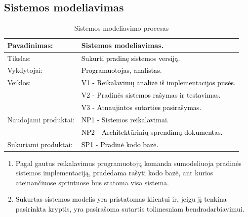 \documentclass{VUMIFPSkursinis}
\begin{document}
	\newpage

	\subsection{Sistemos modeliavimas}
	\begin{center}
		\begin{table}[ht]
			\caption{Sistemos modeliavimo procesas}
			\begin{tabular}{ | l | l | }
				\hline
				Pavadinimas:         & Sistemos modeliavimas.                                                \\ \hline
				Tikslas:             & \textcolor{black}{Sukurti pradinę sistemos versiją.}                  \\ \hline
				Vykdytojai:          & \textcolor{black}{Programuotojas, analistas.}                         \\ \hline
				Veiklos:             & \textcolor{black}{V1 - Reikalavimų analizė iš implementacijos pusės.} \\
				                     & \textcolor{black}{V2 - Pradinės sistemos rašymas ir testavimas.}      \\
				                     & \textcolor{black}{V3 - Atnaujintos sutarties pasirašymas.}            \\ \hline
				Naudojami produktai: & \textcolor{black}{NP1 - Sistemos reikalavimai.}                       \\
				                     & \textcolor{black}{NP2 - Architektūrinių sprendimų dokumentas.}        \\ \hline
				Sukuriami produktai: & \textcolor{black}{SP1 - Pradinė kodo bazė.}                           \\ \hline
			\end{tabular}
		\end{table}
	\end{center}

	\begin{enumerate}
		\item Pagal gautus reikalavimus programuotojų komanda sumodeliuoja pradinės sistemos implementaciją, \textcolor{black}{pradedama rašyti kodo bazė}, ant kurios ateinančiuose sprintuose bus statoma visa sistema.
		\item \textcolor{black}{Sukurtas sistemos modelis yra pristatomas klientui ir, jeigu jį tenkina pasirinkta kryptis, yra pasirašoma sutartis tolimesniam bendradarbiavimui.}
	\end{enumerate}
\end{document}
